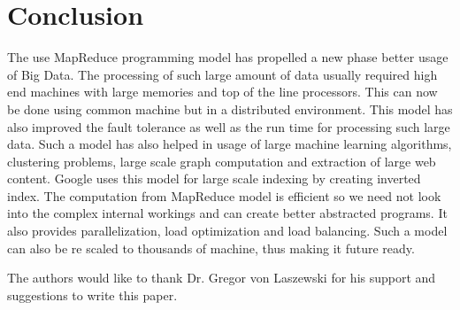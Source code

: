 \documentclass[sigconf]{acmart}
\begin{document}
\section{Conclusion}
The use MapReduce programming model has propelled a new phase better usage of Big Data. The processing of such large amount of data usually required high end machines with large memories and top of the line processors. This can now be done using common machine but in a distributed environment. This model has also improved the fault tolerance as well as the run time for processing such large data. Such a model has also helped in usage of large machine learning algorithms, clustering problems, large scale graph computation and extraction of large web content. Google uses this model for large scale indexing by creating inverted index. The computation from MapReduce model is efficient so we need not look into the complex internal workings and can create better abstracted programs. It also provides parallelization, load optimization and load balancing. Such a model can also be re scaled to thousands of machine, thus making it future ready. 


\begin{acks}

  The authors would like to thank Dr. Gregor von Laszewski for his support and suggestions to write this paper.

\end{acks}


 



\end{document}
